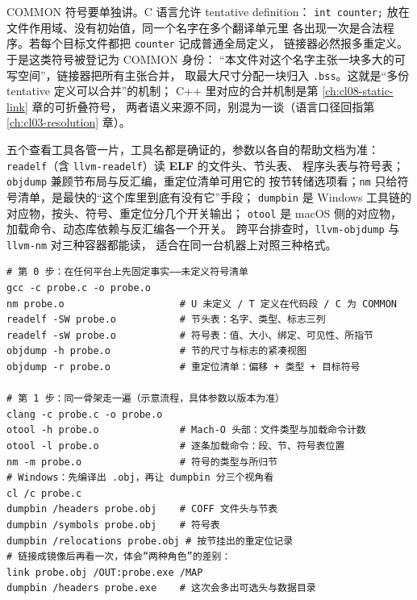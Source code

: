 \documentclass[12pt,a4paper,fontset=fandol]{ctexbook}
\newcommand{\Lang}[1]{\textsf{#1}}
\newcommand{\CPP}{\Lang{C++}}
\newcommand{\Tool}[1]{\texttt{#1}}
\newcommand{\Sect}[1]{\texttt{.#1}}
\newcommand{\Sym}[1]{\texttt{#1}}
\newcommand{\Elf}{\textbf{\textsf{ELF}}}
\newcommand{\Win}{\textsf{Windows}}
\newcommand{\Mac}{\textsf{macOS}}
\begin{document}
COMMON 符号要单独讲。C 语言允许 tentative definition：
\Sym{int counter;} 放在文件作用域、没有初始值，同一个名字在多个翻译单元里
各出现一次是合法程序。若每个目标文件都把 \Sym{counter} 记成普通全局定义，
链接器必然报多重定义。于是这类符号被登记为 COMMON 身份：
“本文件对这个名字主张一块多大的可写空间”，链接器把所有主张合并，
取最大尺寸分配一块归入 \Sect{bss}。这就是“多份 tentative 定义可以合并”的机制；
\CPP{} 里对应的合并机制是第 \ref{ch:cl08-static-link} 章的可折叠符号，
两者语义来源不同，别混为一谈（语言口径回指第 \ref{ch:cl03-resolution} 章）。

五个查看工具各管一片，工具名都是确证的，参数以各自的帮助文档为准：
\Tool{readelf}（含 \Tool{llvm-readelf}）读 \Elf{} 的文件头、节头表、
程序头表与符号表；\Tool{objdump} 兼顾节布局与反汇编，重定位清单可用它的
按节转储选项看；\Tool{nm} 只给符号清单，是最快的“这个库里到底有没有它”手段；
\Tool{dumpbin} 是 \Win{} 工具链的对应物，按头、符号、重定位分几个开关输出；
\Tool{otool} 是 \Mac{} 侧的对应物，加载命令、动态库依赖与反汇编各一个开关。
跨平台排查时，\Tool{llvm-objdump} 与 \Tool{llvm-nm} 对三种容器都能读，
适合在同一台机器上对照三种格式。

\begin{lstlisting}[style=shellstyle, caption={查看命令序列：同一个程序在三个平台上的取材点（示意流程）}]
# 第 0 步：在任何平台上先固定事实——未定义符号清单
gcc -c probe.c -o probe.o
nm probe.o                    # U 未定义 / T 定义在代码段 / C 为 COMMON
readelf -SW probe.o           # 节头表：名字、类型、标志三列
readelf -sW probe.o           # 符号表：值、大小、绑定、可见性、所指节
objdump -h probe.o            # 节的尺寸与标志的紧凑视图
objdump -r probe.o            # 重定位清单：偏移 + 类型 + 目标符号

# 第 1 步：同一骨架走一遍（示意流程，具体参数以版本为准）
clang -c probe.c -o probe.o
otool -h probe.o              # Mach-O 头部：文件类型与加载命令计数
otool -l probe.o              # 逐条加载命令：段、节、符号表位置
nm -m probe.o                 # 符号的类型与所归节
# Windows：先编译出 .obj，再让 dumpbin 分三个视角看
cl /c probe.c
dumpbin /headers probe.obj    # COFF 文件头与节表
dumpbin /symbols probe.obj    # 符号表
dumpbin /relocations probe.obj # 按节挂出的重定位记录
# 链接成镜像后再看一次，体会“两种角色”的差别：
link probe.obj /OUT:probe.exe /MAP
dumpbin /headers probe.exe    # 这次会多出可选头与数据目录
\end{lstlisting}
\end{document}
